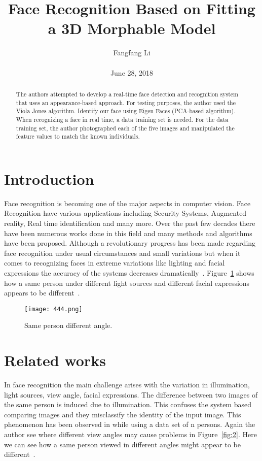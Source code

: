 \documentclass[10pt,twocolumn,letterpaper]{article}
\begin{document}
\title{\textbf{Face Recognition Based on Fitting a 3D Morphable Model}}
\author{Fangfang Li\\\\June 28, 2018}
\maketitle
\begin{abstract}
The authors attempted to develop a real-time face detection and recognition system that uses an appearance-based approach. For testing purposes, the author used the Viola Jones algorithm. Identify our face using Eigen Faces (PCA-based algorithm). When recognizing a face in real time, a data training set is needed. For the data training set, the author photographed each of the five images and manipulated the feature values to match the known individuals.
\end{abstract}
\section{Introduction}
Face recognition is becoming one of the major aspects in computer vision. Face Recognition have various applications including Security Systems, Augmented reality, Real time identification and many more. Over the past few decades there have been numerous works done in this field and many methods and algorithms have been proposed. Although a revolutionary progress has been made regarding face recognition under usual circumstances and small variations but when it comes to recognizing faces in extreme variations like lighting and facial expressions the accuracy of the systems decreases dramatically~\cite{Wolf2011Face}. Figure~\ref{fig:1} shows how a same person under different light sources and different facial expressions appears to be different~\cite{Wagner2009Towards}.
\begin{figure}[!htb]
\begin{center}
\texttt{[image: 444.png]}
\end{center}
\caption{Same person different angle.}
\label{fig:1}
\end{figure}

\section{Related works}
In face recognition the main challenge arises with the variation in illumination, light sources, view angle, facial expressions. The difference between two images of the same person is induced due to illumination. This confuses the system based comparing images and they misclassify the identity of the input image. This phenomenon has been observed in while using a data set of n persons. Again the author see where different view angles may cause problems in Figure~\ref{fig:2}. Here we can see how a same person viewed in different angles might appear to be different~\cite{He2005Face}.
\end{document}
